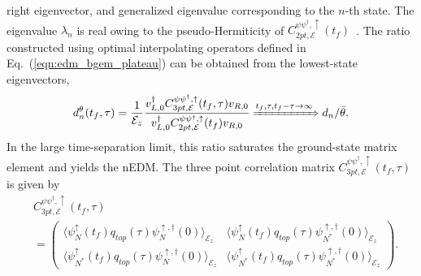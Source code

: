 \documentclass[aps,prl,twocolumn,superscriptaddress,nofootinbib]{revtex4-2}
\newcommand{\mcE}{{\mathcal E}}
\newcommand{\la}{\langle}
\newcommand{\ra}{\rangle}
\begin{document}
right eigenvector, and generalized eigenvalue corresponding to the $n$-th state. The eigenvalue $\lambda_n$ is real owing to the pseudo-Hermiticity of $C^{\psi\psi^\dag,\uparrow}_{2pt,\mcE}(t_f)$~\cite{Blum:2026hul}. The ratio constructed using optimal  interpolating operators defined in Eq.~(\ref{eqn:edm_bgem_plateau}) 
can be obtained from the lowest-state eigenvectors,
\begin{equation}
\label{eqn:edm_bgem_GEVP1}
d_n^\theta(t_f,\tau)
=\frac{1}{\mcE_z} 
  \frac{ v^\dag_{L,0}C^{\psi\psi^\dag,\uparrow}_{3pt,\mcE}(t_f,\tau)v_{R,0}}       {v^\dag_{L,0}C^{\psi\psi^\dag,\uparrow}_{2pt,\mcE}(t_f)v_{R,0}}\xRightarrow{t_f,\tau,t_f-\tau\rightarrow\infty}d_n/\bar{\theta}.
\end{equation}
In the large time-separation limit, this ratio saturates the ground-state matrix element and yields the nEDM. The three point correlation matrix $C^{\psi\psi^\dag,\uparrow}_{3pt,\mcE}(t_f,\tau)$ is given by
\begin{equation}
\label{eq:3ptoriQtop}
\begin{aligned}
&C^{\psi\psi^\dag,\uparrow}_{3pt,\mcE}(t_f,\tau)
\\
&=\left(\begin{array}{cc} \la\psi^\uparrow_N(t_f) q_{top}(\tau)\psi^{\uparrow,\dag}_{N}(0)\ra_{\mcE_z}  & \la\psi^\uparrow_N (t_f)q_{top}(\tau)\psi^{\uparrow,\dag}_{N^*}(0)\ra_{\mcE_z}  \\
\la\psi^\uparrow_{N^*}(t_f)q_{top}(\tau)\psi^{\uparrow,\dag}_{N}(0)\ra_{\mcE_z} &  \la\psi^\uparrow_{N^*}(t_f) q_{top}(\tau)\psi^{\uparrow,\dag}_{N^*}(0)\ra_{\mcE_z}\end{array}\right).
\end{aligned}
\end{equation}


\end{document}
